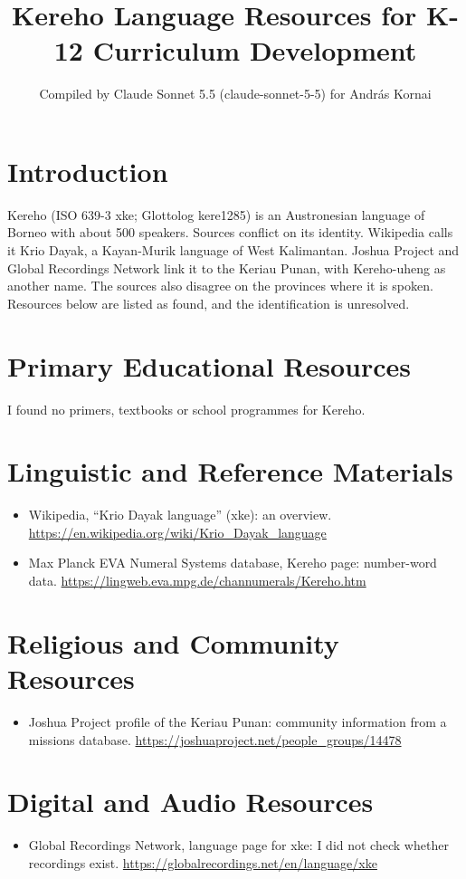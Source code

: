 \documentclass[12pt]{article}
\title{Kereho Language Resources for K-12 Curriculum Development}
\author{Compiled by Claude Sonnet 5.5 (claude-sonnet-5-5) for Andr\'as Kornai}
\date{}
\begin{document}
\maketitle

\section{Introduction}
Kereho (ISO 639-3 xke; Glottolog kere1285) is an Austronesian language of Borneo with about 500 speakers. Sources conflict on its identity. Wikipedia calls it Krio Dayak, a Kayan-Murik language of West Kalimantan. Joshua Project and Global Recordings Network link it to the Keriau Punan, with Kereho-uheng as another name. The sources also disagree on the provinces where it is spoken. Resources below are listed as found, and the identification is unresolved.

\section{Primary Educational Resources}
I found no primers, textbooks or school programmes for Kereho.

\section{Linguistic and Reference Materials}
\begin{itemize}
\item Wikipedia, ``Krio Dayak language'' (xke): an overview. \url{https://en.wikipedia.org/wiki/Krio_Dayak_language}
\item Max Planck EVA Numeral Systems database, Kereho page: number-word data. \url{https://lingweb.eva.mpg.de/channumerals/Kereho.htm}
\end{itemize}

\section{Religious and Community Resources}
\begin{itemize}
\item Joshua Project profile of the Keriau Punan: community information from a missions database. \url{https://joshuaproject.net/people_groups/14478}
\end{itemize}

\section{Digital and Audio Resources}
\begin{itemize}
\item Global Recordings Network, language page for xke: I did not check whether recordings exist. \url{https://globalrecordings.net/en/language/xke}
\end{itemize}
\end{document}
